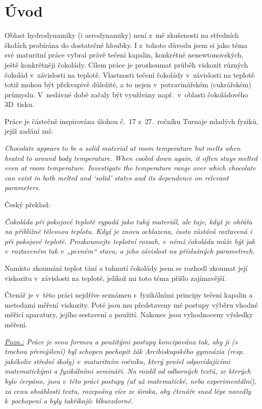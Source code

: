 \documentclass[12pt]{article}
\begin{document}
\section{Úvod}%

Oblast hydrodynamiky (i aerodynamiky) není z~mé zkušenosti na středních školách probírána do dostatečné hloubky. I z~tohoto důvodu jsem si jako téma své maturitní práce vybral právě tečení kapalin, konkrétně nenewtonovských, ještě konkrétněji čokolády. Cílem práce je prozkoumat průběh viskozit různých čokolád v~závislosti na teplotě. Vlastnosti tečení čokolády v~závislosti na teplotě totiž mohou být překvapivě důležité, a to nejen v~potravinářském (cukrářském) průmyslu. V~nedávné době začaly být využívány např.~v~oblasti čokoládového 3D~tisku.~\cite{Article:Flow_properties_molten_chocolate}
\par\noindent
Práce je částečně inspirována úlohou č.~17 z~27.~ročníku Turnaje mladých fyziků, jejíž zadání zní:
\begin{displayquote}
\emph{Chocolate appears to be a solid material at room temperature but melts when heated to around body temperature. When cooled down again, it often stays melted even at room temperature. Investigate the temperature range over which chocolate can exist in both melted and ‘solid’ states and its dependence on relevant parameters.}~\cite{online:Turnaj}
\end{displayquote}
Český překlad:
\begin{displayquote}
\emph{Čokoláda při pokojové teplotě vypadá jako tuhý materiál, ale taje, když je ohřáta na přibližně tělesnou teplotu. Když je znovu ochlazena, často zůstává roztavená i při pokojové teplotě. Prozkoumejte teplotní rozsah, v~němž čokoláda může být jak v~roztaveném tak v~„pevném“ stavu, a jeho závislost na příslušných parametrech.}~\cite{online:Turnaj}
\end{displayquote}
Namísto zkoumání teplot tání a tuhnutí čokolády jsem se rozhodl zkoumat její viskozitu v~závislosti na teplotě, jelikož mi toto téma přišlo zajímavější.
\par\noindent
Čtenář je v~této práci nejdříve seznámen s~fyzikálními principy tečení kapalin a metodami měření viskozity. Poté jsou mu představeny mé postupy výběru vhodné měřicí aparatury, jejího sestavení a použití. Nakonec jsou vyhodnoceny výsledky měření.
\label{sec:zadani_tmf}
\par\noindent
\emph{
\underline{Pozn.:} Práce je svou formou a použitými postupy koncipována tak, aby ji (s trochou přemýšlení) byl schopen pochopit žák Arcibiskupského gymnázia (resp. jakékoliv střední školy) v~maturitním ročníku, který prošel odpovídajícími matematickými a fyzikálními semináři. Na rozdíl od odborných textů, ze kterých bylo čerpáno, jsou v~této práci postupy (ať už matematické, nebo experimentální), za cenu obsáhlosti textu, rozepsány více ze široka, aby čtenáře snad lépe navedly k~pochopení a byly takříkajíc \glqq blbuvzdorné\grqq.}
\end{document}
